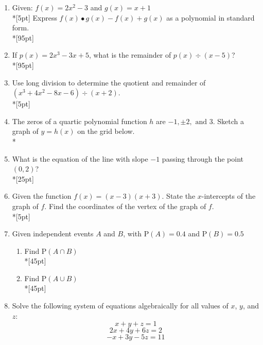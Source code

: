 \documentclass[12pt, oneside]{article}
\begin{document}
\begin{enumerate}
\item Given: $f(x)=2x^2 - 3$ and $g(x)=x+1$\\*[5pt]
Express $f(x) \bullet g(x) - f(x) + g(x)$ as a polynomial in standard form.\\*[95pt] %

\newpage

\item If $p(x)=2x^3-3x+5$, what is the remainder of $p(x) \div (x-5)$? %
\\*[95pt]

\item Use long division to determine the quotient and remainder of $(x^3+4x^2-8x-6) \div (x+2)$.\\*[5pt]

\newpage

\item The zeros of a quartic polynomial function $h$ are  $-1,\pm 2, \text{ and } 3$. Sketch a graph of $y = h(x)$ on the grid below.\\*
\begin{center}
\end{center}

\item What is the equation of the line with slope $-1$ passing through the point $(0, 2)$?\\*[25pt]


\item Given the function $f(x)=(x-3)(x+3)$. State the $x$-intercepts of the graph of $f$. Find the coordinates of the vertex of the graph of $f$.\\*[5pt]


\newpage

\item Given independent events $A$ and $B$, with $\mathrm P(A)=0.4$ and $\mathrm P(B)=0.5$
\begin{enumerate}
    \item Find $\mathrm P(A \cap B)$\\*[45pt]
    \item Find $\mathrm P(A \cup B)$\\*[45pt]
\end{enumerate}


\item Solve the following system of equations algebraically for all values of $x$, $y$, and $z$:
\[x +y+ z=1\]
\[2x+4y+6z=2\]
\[-x+3y-5z=11\]


\end{enumerate}
\end{document}
